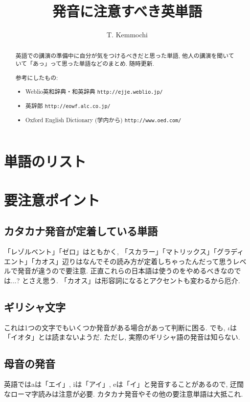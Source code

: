 \documentclass[12pt,a4j]{jsarticle}
\title{発音に注意すべき英単語}
\author{T. Kemmochi}
\begin{document}
\maketitle

\begin{abstract}
英語での講演の準備中に自分が気をつけるべきだと思った単語, 他人の講演を聞いていて「あっ」って思った単語などのまとめ.
随時更新.

参考にしたもの:
\begin{itemize}
\item Weblio英和辞典・和英辞典 \verb|http://ejje.weblio.jp/|
\item 英辞郎 \verb|http://eowf.alc.co.jp/|
\item Oxford English Dictionary (学内から) \verb|http://www.oed.com/|
\end{itemize}
\end{abstract}

\tableofcontents

\section{単語のリスト}


\section{要注意ポイント}

\subsection{カタカナ発音が定着している単語}
「レゾルベント」「ゼロ」はともかく, 「スカラー」「マトリックス」「グラディエント」「カオス」辺りはなんでその読み方が定着しちゃったんだって思うレベルで発音が違うので要注意.
正直これらの日本語は使うのをやめるべきなのでは...? とさえ思う.
「カオス」は形容詞になるとアクセントも変わるから厄介.

\subsection{ギリシャ文字}
これは1つの文字でもいくつか発音がある場合があって判断に困る.
でも, $\iota$は「イオタ」とは読まないようだ.
ただし, 実際のギリシャ語の発音は知らない.

\subsection{母音の発音}
英語ではaは「エイ」, iは「アイ」, eは「イ」と発音することがあるので, 迂闊なローマ字読みは注意が必要.
カタカナ発音やその他の要注意単語は大抵これ.
\end{document}
